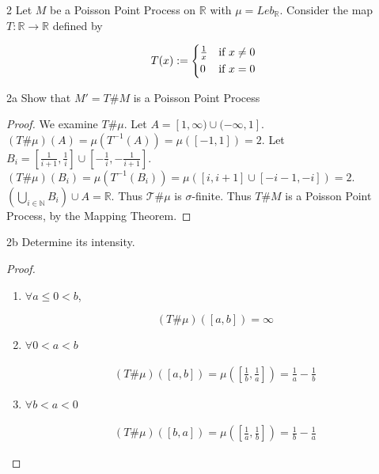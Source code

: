 \documentclass{article}
\newcommand*{\T}{\mathcal{T}}
\newcommand{\R}{\mathbb{R}}
\newcommand{\N}{\mathbb{N}}
\begin{document}
\begin{PROB}{2}\label{Problem 2.}
    Let $M$ be a Poisson Point Process on $\R$ with $\mu = Leb_\R$. Consider the map $T: \R \to \R$ defined by 
    
    \[
    T(x) := \begin{cases*}
        \frac{1}{x} & if $x \neq 0$ \\
        0 & if $x = 0$  
    \end{cases*}
    \]
\end{PROB}
\begin{claim}{2a}\label{Claim 2a.}
    Show that $M' = T \# M$ is a Poisson Point Process
\end{claim}
\begin{proof}
    We examine $T \# \mu$. Let $A = [1, \infty) \cup (-\infty, 1]$. $(T \# \mu)(A) = \mu(T^{-1}(A)) = \mu([-1, 1]) = 2$. Let $B_i = [\frac{1}{i + 1}, \frac{1}{i}] \cup [-\frac{1}{i}, -\frac{1}{i + 1}]$. $(T \# \mu)(B_i) = \mu(T^{-1}(B_i)) = \mu([i, i + 1] \cup [-i - 1, -i]) = 2$. $\left(\bigcup_{i \in \N} B_i\right) \cup A = \R$. Thus $\T \# \mu$ is $\sigma$-finite. Thus $T \# M$ is a Poisson Point Process, by the Mapping Theorem.           
\end{proof}
\begin{claim}{2b}\label{Claim 2b.}
    Determine its intensity. 
\end{claim}
\begin{proof}
    \begin{enumerate}
        \item $\forall a \leq 0 < b$, 
        
        \[ (T \# \mu)([a, b])  = \infty\]
        \item $\forall 0 < a < b$
        
        \begin{align*}
            (T \# \mu)([a, b]) = \mu([\frac{1}{b}, \frac{1}{a}]) = \frac{1}{a} - \frac{1}{b}
        \end{align*}

        \item $\forall b < a < 0$ 
        
        \begin{align*}
            (T \# \mu)([b, a]) = \mu([\frac{1}{a}, \frac{1}{b}]) = \frac{1}{b} - \frac{1}{a}
        \end{align*}
    \end{enumerate}
    
\end{proof}
\end{document}
